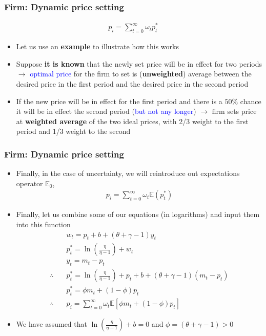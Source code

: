 \documentclass[10pt, xcolor=x11names, table]{beamer}
\begin{document}
\begin{frame}
\frametitle{Firm: Dynamic price setting}
\begin{align*}
p_{i} = \sum_{t=0}^{\infty}\omega_{t}p^{*}_{t}
\end{align*}
\begin{itemize}
\item Let us use an \textbf{example} to illustrate how this works
\item Suppose \textbf{it is known} that the newly set price will be in effect for two periods $\rightarrow $ \textcolor{blue}{optimal price} for the firm to set is (\textbf{unweighted}) average between the desired price in the first period and the desired price in the second period
\item If the new price will be in effect for the first period and there is a $50\%$ chance it will be in effect the second period (\textcolor{blue}{but not any longer}) $\rightarrow$ firm sets price at \textbf{weighted average} of the two ideal prices, with 2/3 weight to the first period and 1/3 weight to the second
\end{itemize}
\end{frame}

\begin{frame}
\frametitle{Firm: Dynamic price setting}
\begin{itemize}
\item Finally, in the case of uncertainty, we will reintroduce out expectations operator $\mathbb{E}_{0}$,
\begin{align*}
p_{i} = \sum_{t=0}^{\infty}\omega_{t}\mathbb{E}({p^{*}_{t}})
\end{align*}
\item Finally, let us combine some of our equations (in logarithms) and input them into this function
\begin{align*}
&w_{t}  = p_{t} + b + (\theta+\gamma-1)y_{t}  \\
&p_{t}^{*} = \ln(\frac{\eta}{\eta-1}) + w_{t}  \\
&y_{t} = m_{t} - p_{t}                         \\
\therefore \quad &p_{t}^{*} = \ln(\frac{\eta}{\eta-1}) + p_{t} + b + (\theta+\gamma-1)(m_{t} - p_{t}) \\
&p_{t}^{*} = \phi{m_{t}} + (1-\phi)p_{t} \\
\therefore \quad &p_{i} = \sum_{t=0}^{\infty}\omega_{t}\mathbb{E}[\phi{m_{t}} + (1-\phi)p_{t}]
\end{align*}
\item We have assumed that $\textstyle \ln(\frac{\eta}{\eta-1}) + b = 0$ and $\textstyle \phi = (\theta + \gamma - 1) >0$
\end{itemize}
\end{frame}
\end{document}
